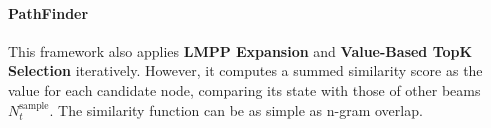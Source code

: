 \paragraph{PathFinder \citep{golovneva2023pathfinder}}
This framework also applies \textbf{LMPP Expansion} and \textbf{Value-Based TopK Selection} iteratively.
However, it computes a summed similarity score as the value for each candidate node, comparing its state with those of other beams \(N_{t}^{\text{sample}}\). The similarity function can be as simple as n-gram overlap.

\paragraph{}
